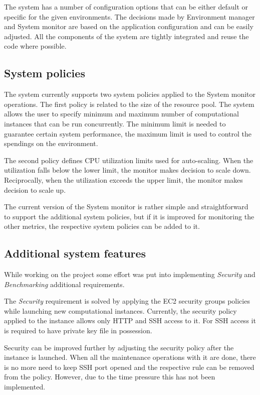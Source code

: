 \documentclass[conference]{IEEEtran}
\begin{document}
The system has a number of configuration options that can be either default or specific for the given environments. The decisions made by Environment manager and System monitor are based on the application configuration and can be easily adjusted. All the components of the system are tightly integrated and reuse the code where possible. 

\subsection{System policies}

The system currently supports two system policies applied to the System monitor operations. The first policy is related to the size of the resource pool. The system allows the user to specify minimum and maximum number of computational instances that can be run concurrently. The minimum limit is needed to guarantee certain system performance, the maximum limit is used to control the spendings on the environment.

The second policy defines CPU utilization limits used for auto-scaling. When the utilization falls below the lower limit, the monitor makes decision to scale down. Reciprocally, when the utilization exceeds the upper limit, the monitor makes decision to scale up. 

The current version of the System monitor is rather simple and straightforward to support the additional system policies, but if it is improved for monitoring the other metrics, the respective system policies can be added to it.

\subsection{Additional system features}

While working on the project some effort was put into implementing \emph{Security} and \emph{Benchmarking} additional requirements.

The \emph{Security} requirement is solved by applying the EC2 security groups policies while launching new computational instances. Currently, the security policy applied to the instance allows only HTTP and SSH access to it. For SSH access it is required to have private key file in possession. 

Security can be improved further by adjusting the security policy after the instance is launched. When all the maintenance operations with it are done, there is no more need to keep SSH port opened and the respective rule can be removed from the policy. However, due to the time pressure this has not been implemented.
\end{document}
